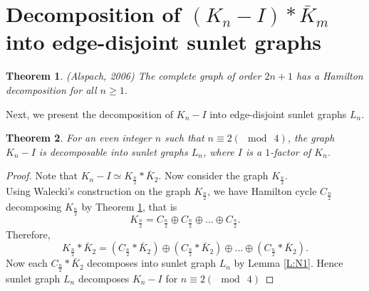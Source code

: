\documentclass[12pt]{report}
\newtheorem{thm}{Theorem}[section]
\begin{document}
\section{Decomposition of  $(K_n-I)*\bar{K}_m$ into edge-disjoint sunlet graphs }
\begin{thm}\label{T:ALW}(Alspach, 2006) %
 The complete graph of order $2n+1$ has a Hamilton decomposition for
all $n\geq 1$.
\end{thm}
Next, we present the decomposition of $K_n-I$ into edge-disjoint sunlet graphs $L_n$.
\begin{thm}\label{T:I1}
For an even integer $n$ such that $n\equiv 2(\mod\ 4)$, the graph
$K_n-I$ is decomposable into sunlet graphs $L_n$, where $I$ is a
$1$-factor of $K_n$.
\end{thm}
\begin{proof}
Note that  $K_n-I\simeq K_{\frac{n}{2}}*\bar{K}_{2}$. %
Now consider the graph $K_{\frac{n}{2}}$.\\
Using Walecki's construction on the graph $K_{\frac{n}{2}}$, we have
Hamilton cycle $C_{\frac{n}{2}}$ decomposing  $K_{\frac{n}{2}}$ by
Theorem \ref{T:ALW}, that is
$$K_{\frac{n}{2}}=C_{\frac{n}{2}}\oplus C_{\frac{n}{2}}\oplus...\oplus C_{\frac{n}{2}}.$$
Therefore,
 $$K_{\frac{n}{2}}*\bar{K}_{2}=(C_{\frac{n}{2}}*\bar{K}_2)\oplus (C_{\frac{n}{2}}*\bar{K}_2)\oplus...\oplus (C_{\frac{n}{2}}*\bar{K}_2).$$
Now  each $C_{\frac{n}{2}}*\bar{K}_2$ decomposes into sunlet graph
$L_n$ by Lemma \ref{L:N1}. Hence sunlet graph $L_n$ decomposes
$K_n-I$ for $n\equiv 2 (\mod\ 4)$
\end{proof}
\end{document}
